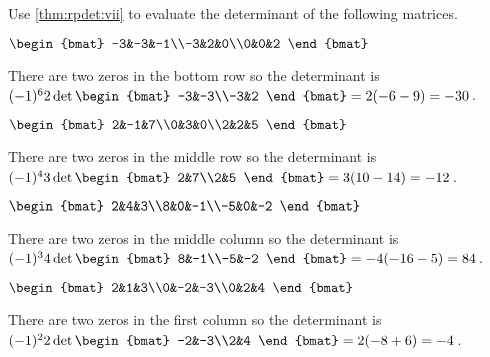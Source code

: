 \begin{example} \label{eg:rpdet}
Use \cref{thm:rpdet:vii} to evaluate the determinant of the following matrices.  
\begin{Parts}
\item \(\begin{bmat} -3&-3&-1\\-3&2&0\\0&0&2 \end{bmat}\)
\begin{solution} 
There are two zeros in the bottom row so the determinant is \((-1)^62\det\begin{bmat} -3&-3\\-3&2 \end{bmat}=2(-6-9)=-30\)\,. 
\end{solution}

\item \(\begin{bmat} 2&-1&7\\0&3&0\\2&2&5 \end{bmat}\)
\begin{solution} 
There are two zeros in the middle row so the determinant is \((-1)^43\det\begin{bmat} 2&7\\2&5 \end{bmat}=3(10-14)=-12\)\,. 
\end{solution}

\begin{reduce}
\item \(\begin{bmat} 2&4&3\\8&0&-1\\-5&0&-2 \end{bmat}\)
\begin{solution} 
There are two zeros in the middle column so the determinant is \((-1)^34\det\begin{bmat} 8&-1\\-5&-2 \end{bmat}=-4(-16-5)=84\)\,. 
\end{solution}
\end{reduce}

\item \(\begin{bmat} 2&1&3\\0&-2&-3\\0&2&4 \end{bmat}\)
\begin{solution} 
There are two zeros in the first column so the determinant is \((-1)^22\det\begin{bmat} -2&-3\\2&4 \end{bmat}=2(-8+6)=-4\)\,. 
\end{solution}

\end{Parts}
\end{example}
